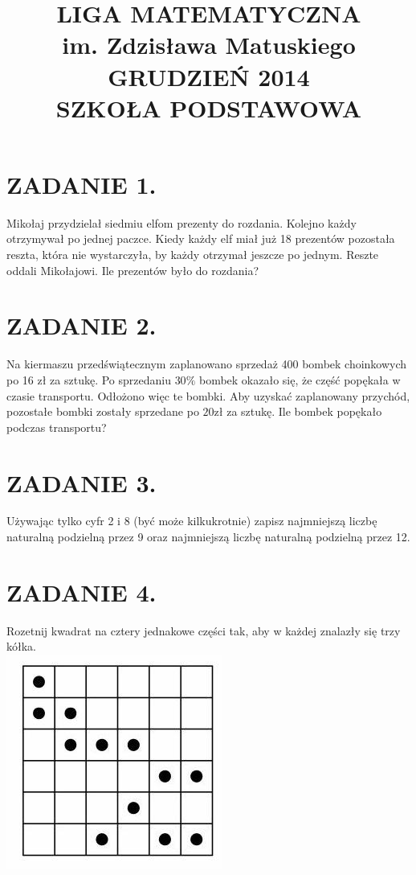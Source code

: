\documentclass[10pt]{article}
\title{LIGA MATEMATYCZNA \\
 im. Zdzisława Matuskiego \\
 GRUDZIEŃ 2014 \\
 SZKOŁA PODSTAWOWA }
\author{}
\date{}
\begin{document}
\maketitle
\section*{ZADANIE 1.}
Mikołaj przydzielał siedmiu elfom prezenty do rozdania. Kolejno każdy otrzymywał po jednej paczce. Kiedy każdy elf miał już 18 prezentów pozostała reszta, która nie wystarczyła, by każdy otrzymał jeszcze po jednym. Reszte oddali Mikołajowi. Ile prezentów było do rozdania?

\section*{ZADANIE 2.}
Na kiermaszu przedświątecznym zaplanowano sprzedaż 400 bombek choinkowych po 16 zł za sztukę. Po sprzedaniu \(30 \%\) bombek okazało się, że część popękała w czasie transportu. Odłożono więc te bombki. Aby uzyskać zaplanowany przychód, pozostałe bombki zostały sprzedane po \(20 \mathrm{zł}\) za sztukę. Ile bombek popękało podczas transportu?

\section*{ZADANIE 3.}
Używając tylko cyfr 2 i 8 (być może kilkukrotnie) zapisz najmniejszą liczbę naturalną podzielną przez 9 oraz najmniejszą liczbę naturalną podzielną przez 12.

\section*{ZADANIE 4.}
Rozetnij kwadrat na cztery jednakowe części tak, aby w każdej znalazły się trzy kółka.\\
\includegraphics[max width=\textwidth, center]{2024_11_21_428684ae64167c130f83g-1(1)}
\end{document}
